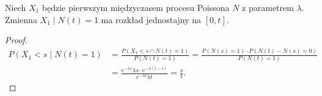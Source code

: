 \begin{lemma}
	Niech \(X_1\) będzie pierwszym międzyczasem procesu Poissona \(N\) z parametrem \(\lambda\). Zmienna \(X_1 \mid N\left( t  \right) = 1\) ma rozkład jednostajny na \([0,t]\).
\end{lemma}
\begin{proof}
	\begin{align*}
		P\left( X_1 < s \mid N\left( t  \right) = 1 \right) & = \frac{P\left( X_1 < s \cap N\left( t  \right) = 1 \right) }{P\left( N\left( t  \right) = 1 \right) } = \frac{P\left( N\left( s  \right) = 1 \right) \cdot  P\left( N\left( t  \right) - N\left( s  \right) = 0 \right) }{P\left( N\left( t \right) = 1 \right) } \\
		                                                    & = \frac{e^{-\lambda s }\lambda s \cdot  e^{-\lambda \left( t-s \right) }}{e^{-\lambda t }\lambda t } = \frac{s}{t}.
	\end{align*}
\end{proof}

